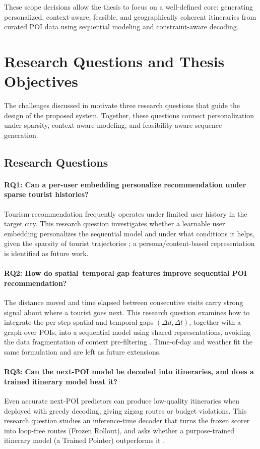 These scope decisions allow the thesis to focus on a well-defined core: generating personalized, context-aware, feasible, and geographically coherent itineraries from curated POI data using sequential modeling and constraint-aware decoding.

\section{Research Questions and Thesis Objectives}
\label{sec:prob-rq}

The challenges discussed in  motivate three research questions that guide the design of the proposed system. Together, these questions connect personalization under sparsity, context-aware modeling, and feasibility-aware sequence generation.

\subsection{Research Questions}
\paragraph{RQ1: Can a per-user embedding personalize recommendation under sparse tourist histories?}
Tourism recommendation frequently operates under limited user history in the target city. This research question investigates whether a learnable user embedding personalizes the sequential model and under what conditions it helps, given the sparsity of tourist trajectories \citep{burke2002hybrid, koren2009mf}; a persona/content-based representation is identified as future work.

\paragraph{RQ2: How do spatial--temporal gap features improve sequential POI recommendation?}
The distance moved and time elapsed between consecutive visits carry strong signal about where a tourist goes next. This research question examines how to integrate the per-step spatial and temporal gaps $(\Delta d,\Delta t)$, together with a graph over POIs, into a sequential model using shared representations, avoiding the data fragmentation of context pre-filtering \citep{adomavicius2005tois, adomavicius2022cars, villegas2018cars}. Time-of-day and weather fit the same formulation and are left as future extensions.

\paragraph{RQ3: Can the next-POI model be decoded into itineraries, and does a trained itinerary model beat it?}
Even accurate next-POI predictors can produce low-quality itineraries when deployed with greedy decoding, giving zigzag routes or budget violations. This research question studies an inference-time decoder that turns the frozen scorer into loop-free routes (Frozen Rollout), and asks whether a purpose-trained itinerary model (a Trained Pointer) outperforms it \citep{wu2025tlmr}.

